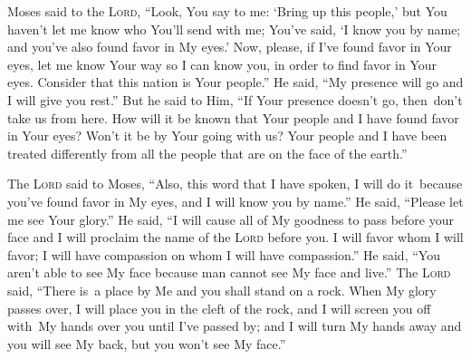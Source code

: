 \begin{inparaenum}
   Moses said to the \textsc{Lord}, ``Look, You say to me: `Bring up this people,' but You haven't let me know who You'll send with me; You've said, `I know you by name; and you've also found favor in My eyes.'%
   Now, please, if I've found favor in Your eyes, let me know Your way so I can know you, in order to find favor in Your eyes. Consider that this nation is Your people.''%
   He said, ``My presence will go and I will give you rest.''%
   But he said to Him, ``If Your presence doesn't go, then\understood\ don't take us from here.%
   How will it be known that Your people and I have found favor in Your eyes? Won't it be by Your going with us? Your people and I have been treated differently from all the people that are on the face of the earth.''%
  
   The \textsc{Lord} said to Moses, ``Also, this word that I have spoken, I will do it\understood\ because you've found favor in My eyes, and I will know you by name.''%
   He said, ``Please let me see Your glory.''%
   He said, ``I will cause all of My goodness to pass before your face and I will proclaim the name of the \textsc{Lord} before you. I will favor whom I will favor; I will have compassion on whom I will have compassion.''%
   He said, ``You aren't able to see My face because man cannot see My face and live.''%
   The \textsc{Lord} said, ``There is\understood\ a place by Me and you shall stand on a rock.%
   When My glory passes over, I will place you in the cleft of the rock, and I will screen you off with\understood\ My hands over you until I've passed by;%
   and I will turn My hands away and you will see My back, but you won't see My face.''%
\end{inparaenum}
